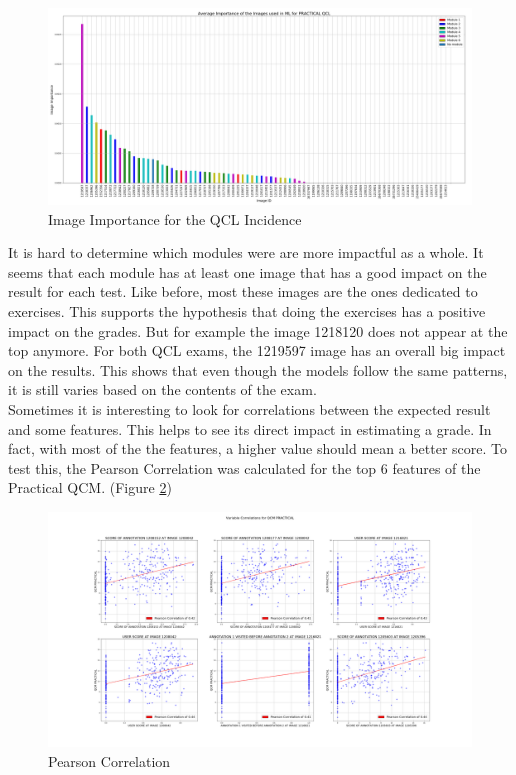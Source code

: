 \documentclass[a4paper,11pt]{report}
\numberwithin{figure}{chapter} %
\begin{document}
      \begin{figure}[H]
      \centering
      \includegraphics[width=.99\linewidth]{plots/im_importance_PRACTICAL_QCL_2018-04-29_14_33_48.png}
      \caption{Image Importance for the QCL Incidence}
      \label{fig:im_tp4}
      \end{figure}

	It is hard to determine which modules were are more impactful as a whole.
    It seems that each module has at least one image that has a good impact on the result for each test.
	Like before, most these images are the ones dedicated to exercises.
	This supports the hypothesis that doing the exercises has a positive impact on the grades.
	But for example the image 1218120 does not appear at the top anymore.
    For both QCL exams, the 1219597 image has an overall big impact on the results.
	This shows that even though the models follow the same patterns, it is still varies based on the contents of the exam.\\

    Sometimes it is interesting  to look for correlations between the expected result and some features.
    This helps to see its direct impact in estimating a grade.
    In fact, with most of the the features, a higher value should mean a better score.
    To test this, the Pearson Correlation was calculated for the top 6 features of the Practical QCM. (Figure \ref{fig:corr_tp})
      \begin{figure}[H]
      \centering
      \includegraphics[width=.99\linewidth]{plots/var_correlation_QCM_PRACTICAL_2018-04-29_14_38_14.png}
      \caption{Pearson Correlation}
      \label{fig:corr_tp}
      \end{figure}
\end{document}

